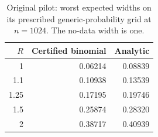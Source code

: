 \begin{table}[htbp]
\centering
\begin{tabular}{rrr}
\toprule
$R$ & Certified binomial & Analytic \\
\midrule
1 & 0.06214 & 0.08839 \\
1.1 & 0.10938 & 0.13539 \\
1.25 & 0.17195 & 0.19746 \\
1.5 & 0.25874 & 0.28320 \\
2 & 0.38717 & 0.40939 \\
\bottomrule
\end{tabular}
\caption{Original pilot: worst expected widths on its prescribed generic-probability grid at $n=1024$. The no-data width is one.}
\label{tab:pilot}
\end{table}
